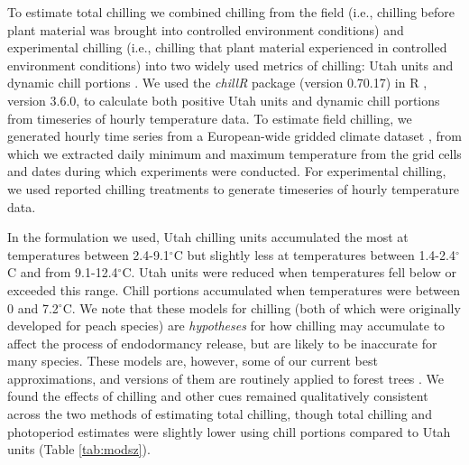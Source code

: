 \documentclass{article}
\begin{document}
\par To estimate total chilling we combined chilling from the field (i.e., chilling before plant material was brought into controlled environment conditions) and experimental chilling (i.e., chilling that plant material experienced in controlled environment conditions) into two widely used metrics of chilling: Utah units and dynamic chill portions \citep{dennis2003}. We used the \textit{chillR} package (version 0.70.17) in R \citep{Rcore:2017, chillR2019}, version 3.6.0, to calculate both positive Utah units and dynamic chill portions from timeseries of hourly temperature data. To estimate field chilling, we generated hourly time series from a European-wide gridded climate dataset \citep{cornes2018}, from which we extracted daily minimum and maximum temperature from the grid cells and dates during which experiments were conducted. For experimental chilling, we used reported chilling treatments to generate timeseries of hourly temperature data.
\par In the formulation we used, Utah chilling units accumulated the most at temperatures between 2.4-9.1$^{\circ}$C but slightly less at temperatures between 1.4-2.4$^{\circ}$C and from 9.1-12.4$^{\circ}$C. Utah units were reduced when temperatures fell below or exceeded this range. Chill portions accumulated when temperatures were between 0 and 7.2$^{\circ}$C. We note that these models for chilling (both of which were originally developed for peach species) are \emph{hypotheses} for how chilling may accumulate to affect the process of endodormancy release, but are likely to be inaccurate for many species. These models are, however, some of our current best approximations, and versions of them are routinely applied to forest trees \citep[e.g.,][]{Harrington:2010}. We found the effects of chilling and other cues remained qualitatively consistent across the two methods of estimating total chilling, though total chilling and photoperiod estimates were slightly lower using chill portions compared to Utah units (Table \ref{tab:modsz}).
\end{document}
